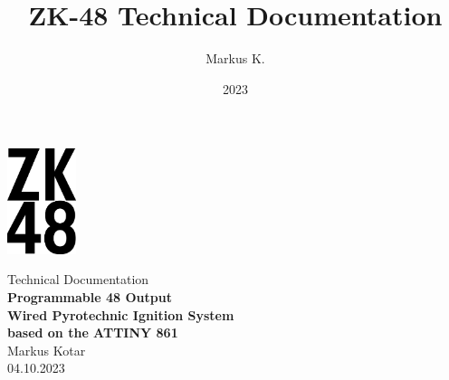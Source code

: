 

\title{ZK-48 Technical Documentation}
\author{Markus K.}
\date{2023}



\begin{titlepage}
\begin{center}
\vspace*{1cm}
\includegraphics[width=2cm]{./Figures/zk_48_logo.png}
\vspace*{1cm}

\Huge {Technical Documentation\\} 
\vspace*{0.5cm}
\Huge{\textbf{Programmable 48 Output \\ Wired Pyrotechnic Ignition System\\ based on the ATTINY 861\\}}
\vspace*{12cm} 
\Large{Markus Kotar\\}
\vspace*{0.5cm}
\Large{04.10.2023}

\end{center}
\end{titlepage}

\pagebreak 

\tableofcontents

\pagebreak







